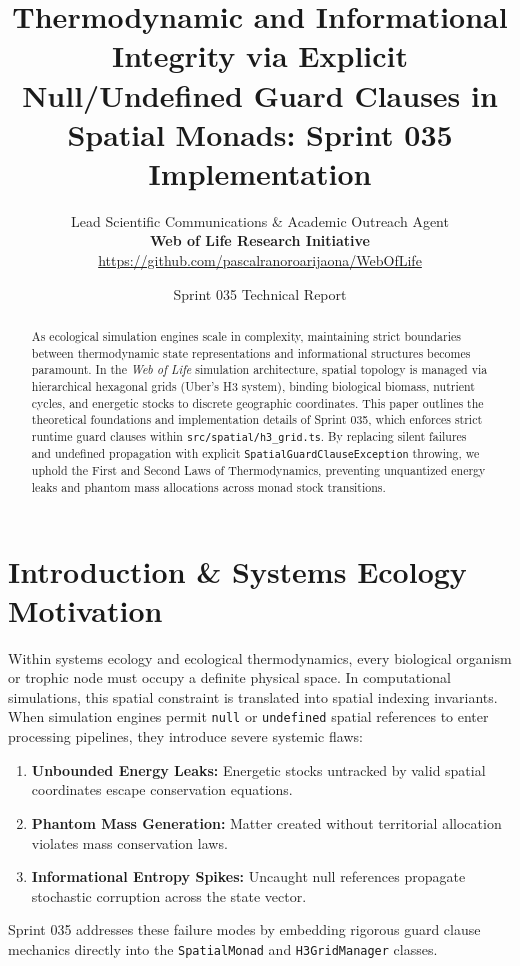 \documentclass[11pt, a4paper]{article}
\title{\textbf{Thermodynamic and Informational Integrity via Explicit Null/Undefined Guard Clauses in Spatial Monads: Sprint 035 Implementation}}
\author{Lead Scientific Communications \& Academic Outreach Agent \\ \textbf{Web of Life Research Initiative} \\ \url{https://github.com/pascalranoroarijaona/WebOfLife}}
\date{Sprint 035 Technical Report}
\begin{document}
\maketitle

\begin{abstract}
As ecological simulation engines scale in complexity, maintaining strict boundaries between thermodynamic state representations and informational structures becomes paramount. In the \textit{Web of Life} simulation architecture, spatial topology is managed via hierarchical hexagonal grids (Uber's H3 system), binding biological biomass, nutrient cycles, and energetic stocks to discrete geographic coordinates. This paper outlines the theoretical foundations and implementation details of Sprint 035, which enforces strict runtime guard clauses within \texttt{src/spatial/h3\_grid.ts}. By replacing silent failures and undefined propagation with explicit \texttt{SpatialGuardClauseException} throwing, we uphold the First and Second Laws of Thermodynamics, preventing unquantized energy leaks and phantom mass allocations across monad stock transitions.
\end{abstract}

\section{Introduction \& Systems Ecology Motivation}
Within systems ecology and ecological thermodynamics, every biological organism or trophic node must occupy a definite physical space. In computational simulations, this spatial constraint is translated into spatial indexing invariants. When simulation engines permit \texttt{null} or \texttt{undefined} spatial references to enter processing pipelines, they introduce severe systemic flaws:
\begin{enumerate}
    \item \textbf{Unbounded Energy Leaks:} Energetic stocks untracked by valid spatial coordinates escape conservation equations.
    \item \textbf{Phantom Mass Generation:} Matter created without territorial allocation violates mass conservation laws.
    \item \textbf{Informational Entropy Spikes:} Uncaught null references propagate stochastic corruption across the state vector.
\end{enumerate}
Sprint 035 addresses these failure modes by embedding rigorous guard clause mechanics directly into the \texttt{SpatialMonad} and \texttt{H3GridManager} classes.
\end{document}
